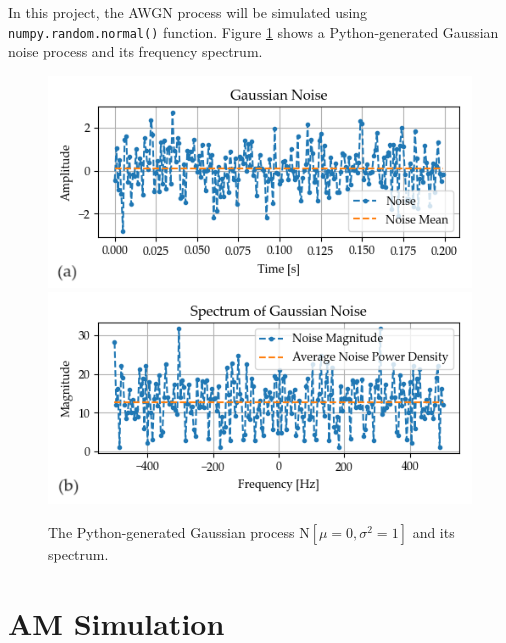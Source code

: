 \documentclass[../ECE459FinalProjectReport.tex]{subfiles}
\begin{document}
In this project, the AWGN process will be simulated using \verb|numpy.random.normal()| function. Figure \ref{fig:gaussian-noise} shows a Python-generated Gaussian noise process and its frequency spectrum.
\begin{figure}[tb]
        \centering
        \includegraphics[width=0.7\linewidth]{plots/gaussian_noise.png}
        \includegraphics[width=0.7\linewidth]{plots/gaussian_noise_spectrum.png}
        \caption{The Python-generated Gaussian process $\mathrm{N}\left[\mu = 0, \sigma^2 = 1\right]$ and its spectrum.}
        \label{fig:gaussian-noise}
\end{figure}


\section{AM Simulation}
\end{document}
